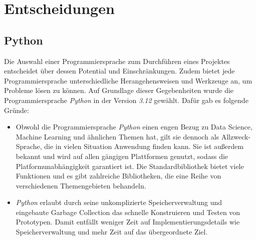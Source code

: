 \section{Entscheidungen}\label{sec:entscheidungen}

\subsection{Python}

Die Auswahl einer Programmiersprache zum Durchführen eines Projektes entscheidet über dessen Potential und Einschränkungen.
Zudem bietet jede Programmiersprache unterschiedliche Herangehensweisen und Werkzeuge an, um Probleme lösen zu können.
Auf Grundlage dieser Gegebenheiten wurde die Programmiersprache \textit{Python} in der Version \textit{3.12} gewählt.
Dafür gab es folgende Gründe:

\begin{itemize}
    \item Obwohl die Programmiersprache \textit{Python} einen engen Bezug zu Data Science, Machine Learning und ähnlichen Themen hat, gilt sie dennoch als Allzweck-Sprache,
    die in vielen Situation Anwendung finden kann. Sie ist außerdem bekannt und wird auf allen gängigen Plattformen genutzt, sodass die Platformunabhängigkeit garantiert ist. 
    Die Standardbibliothek bietet viele Funktionen und es gibt zahlreiche Bibliotheken, die eine Reihe von verschiedenen Themengebieten behandeln.
    \item \textit{Python} erlaubt durch seine unkomplizierte Speicherverwaltung und eingebaute Garbage Collection das schnelle Konstruieren und Testen von Prototypen.
    Damit entfällt weniger Zeit auf Implementierungsdetails wie Speicherverwaltung und mehr Zeit auf das übergeordnete Ziel.
\end{itemize}





